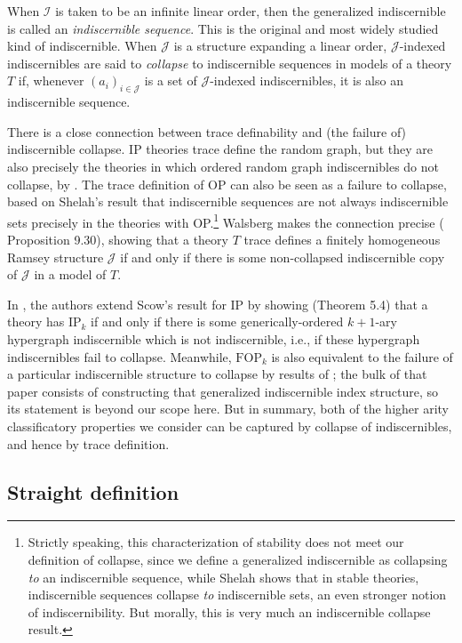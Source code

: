 \documentclass{article}
\newcommand{\calI}{\mathcal{I}}
\newcommand{\calJ}{\mathcal{J}}
\theoremstyle{definition}
\theoremstyle{definition}
\theoremstyle{definition}
\begin{document}
When $\calI$ is taken to be an infinite linear order, then the generalized indiscernible is called an \textit{indiscernible sequence}. This is the original and most widely studied kind of indiscernible. When $\calJ$ is a structure expanding a linear order, $\calJ$-indexed indiscernibles are said to \textit{collapse} to indiscernible sequences in models of a theory $T$ if, whenever $(a_i)_{i\in\calJ}$ is a set of $\calJ$-indexed indiscernibles, it is also an indiscernible sequence.

There is a close connection between trace definability and (the failure of) indiscernible collapse. IP theories trace define the random graph, but they are also precisely the theories in which ordered random graph indiscernibles do not collapse, by \cite{scow2012characterization}. The trace definition of OP can also be seen as a failure to collapse, based on Shelah's result that indiscernible sequences are not always indiscernible sets precisely in the theories with OP.\footnote{Strictly speaking, this characterization of stability does not meet our definition of collapse, since we define a generalized indiscernible as collapsing \textit{to} an indiscernible sequence, while Shelah shows that in stable theories, indiscernible sequences collapse \textit{to} indiscernible sets, an even stronger notion of indiscernibility. But morally, this is very much an indiscernible collapse result.} Walsberg makes the connection precise (\cite{walsberg2025trace} Proposition 9.30), showing that a theory $T$ trace defines a finitely homogeneous Ramsey structure $\calJ$ if and only if there is some non-collapsed indiscernible copy of $\calJ$ in a model of $T$.

In \cite{chernikov2019n}, the authors extend Scow's result for IP by showing (Theorem 5.4) that a theory has $\text{IP}_k$ if and only if there is some generically-ordered $k+1$-ary hypergraph indiscernible which is not indiscernible, i.e., if these hypergraph indiscernibles fail to collapse. Meanwhile, $\text{FOP}_k$ is also equivalent to the failure of a particular indiscernible structure to collapse by results of \cite{abd2025higher}; the bulk of that paper consists of constructing that generalized indiscernible index structure, so its statement is beyond our scope here. But in summary, both of the higher arity classificatory properties we consider can be captured by collapse of indiscernibles, and hence by trace definition.



\subsection{Straight definition}\label{straight definition section}
\end{document}
